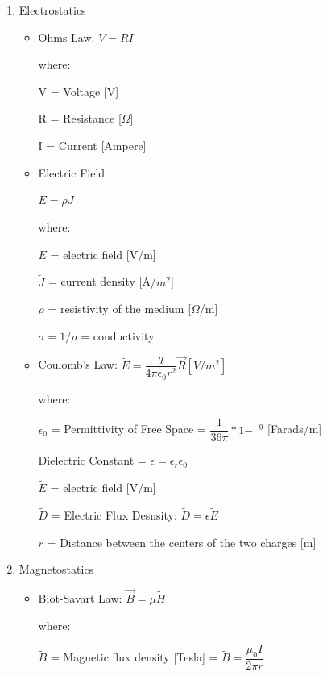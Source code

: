 \documentclass[10pt]{article}
\renewcommand{\frac}{\dfrac}
\begin{document}
\begin{enumerate}

	\item Electrostatics
	
	\begin{itemize}
	
		\item Ohms Law: $V = RI$
	
		where:
		
		V = Voltage [V]
		
		R = Resistance [$\Omega$]
		
		I = Current [Ampere]
		
		\item Electric Field
		
		$\tilde{E} = \rho \tilde{J}$
		
		where: 
		
		$\tilde{E}$ = electric field [V/m]
		
		$\tilde{J}$ = current density [A/$m^2$]
		
		$\rho$ = resistivity of the medium [$\Omega$/m]
		
		$\sigma = 1/\rho$ = conductivity 
		
		
		
		\item Coulomb's Law: $\tilde{E} =  \frac{q}{4\pi \epsilon_0 r^2}\vec{R} [V/m^2]$

		where:

		$\epsilon_0$ = Permittivity of Free Space  = $\frac{1}{36\pi}*1-^{-9}$ [Farads/m]

		Dielectric Constant = $\epsilon = \epsilon_r \epsilon_0$
		
		$\tilde{E}$ = electric field [V/m]
		
		$\tilde{D}$ = Electric Flux Desnsity: $\tilde{D} = \epsilon \tilde{E}$
		
		

		$r$ = Distance between the centers of the two charges [m]
		
		\end{itemize}
		
	\item Magnetostatics
		\begin{itemize}

		\item Biot-Savart Law: $\vec{B} = \mu \tilde{H}$

		where:

		$\tilde{B}$ = Magnetic flux density [Tesla] = $\tilde{B} = \frac{\mu_0 I}{2\pi r}$
		

\end{itemize}
\end{enumerate}
\end{document}
